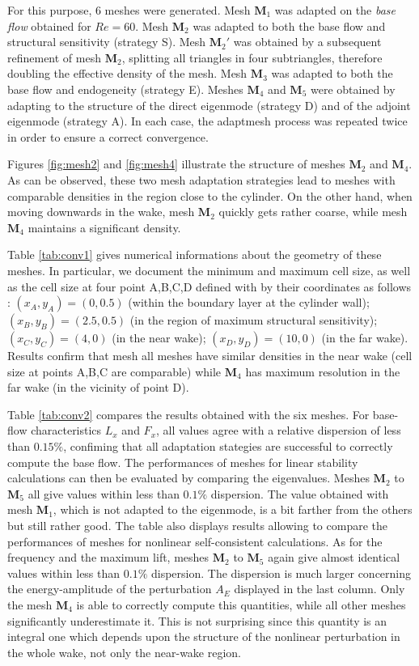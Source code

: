 \documentclass[twocolumn,10pt]{asme2ej}
\begin{document}
For this purpose, 6 meshes were generated. 
Mesh $\mathbf{M}_1$ was adapted on the {\em base flow} obtained for $Re=60$.
Mesh $\mathbf{M}_2$ was adapted to both the base flow and structural sensitivity (strategy S).
Mesh $\mathbf{M}_2'$ was obtained by a subsequent refinement of mesh $\mathbf{M}_2$, splitting all triangles in four subtriangles, therefore doubling the effective density of the mesh.
Mesh $\mathbf{M}_3$ was adapted to both the base flow and endogeneity (strategy E).
Meshes $\mathbf{M}_4$ and $\mathbf{M}_5$ were obtained by adapting to the structure of the direct eigenmode (strategy D) and of the adjoint eigenmode (strategy A). In each case, the adaptmesh process was repeated twice in order to ensure a correct convergence.

Figures \ref{fig:mesh2} and \ref{fig:mesh4} illustrate the structure of meshes $\mathbf{M}_2$ and $\mathbf{M}_4$. As can be observed, these two mesh adaptation strategies lead to meshes with comparable densities in the region close to the cylinder. On the other hand, when moving downwards in the wake, mesh $\mathbf{M}_2$ quickly gets rather coarse, while mesh $\mathbf{M}_4$ maintains a significant density.

Table \ref{tab:conv1} gives numerical informations about the geometry of these meshes. In particular, we document the minimum and maximum cell size, as well as the cell size at four point A,B,C,D defined with by their coordinates as follows : $(x_A,y_A) = (0,0.5)$ (within the boundary layer at the cylinder wall); $(x_B,y_B) = (2.5,0.5)$ (in the region of maximum structural sensitivity); $(x_C,y_C) = (4,0)$ (in the near wake); $(x_D,y_D) = (10,0)$ (in the far wake). Results confirm that mesh all meshes have similar densities in the near wake (cell size at points A,B,C are comparable) 
while $\mathbf{M}_4$ has maximum resolution in the far wake (in the vicinity of point D).

Table  \ref{tab:conv2} compares the results obtained with the six meshes. For base-flow characteristics $L_x$ and $F_x$, all values agree with a relative dispersion of less than $0.15\%$, confiming that all adaptation stategies are successful to correctly compute the base flow. 
The performances of meshes for linear stability calculations can then be evaluated by comparing the eigenvalues. Meshes $\mathbf{M}_2$ to $\mathbf{M}_5$ all give values within less than $0.1\%$ dispersion. The value obtained with mesh  $\mathbf{M}_1$, which is not adapted to the eigenmode, is a bit farther from the others but still rather good. The table also displays results allowing to compare the performances of meshes for nonlinear self-consistent calculations. As for the frequency and the maximum lift, meshes $\mathbf{M}_2$ to $\mathbf{M}_5$ again give almost identical values within less than $0.1\%$ dispersion. The dispersion is much larger concerning the energy-amplitude of the perturbation $A_E$ displayed in the last column. Only the mesh $\mathbf{M}_4$ is able to correctly compute this quantities, while all other meshes significantly underestimate it. This is not surprising since this quantity is an integral one which depends upon the structure of the nonlinear perturbation in the whole wake, not only the near-wake region.
\end{document}
